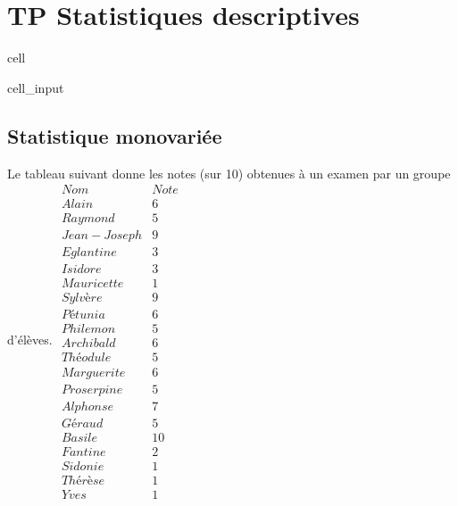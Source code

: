 \documentclass[letterpaper,10pt,french]{sphinxmanual}
\begin{document}
\sphinxstepscope


\chapter{TP Statistiques descriptives}
\label{\detokenize{TP1_statsDescriptives:tp-statistiques-descriptives}}\label{\detokenize{TP1_statsDescriptives::doc}}
\begin{sphinxuseclass}{cell}
\begin{sphinxuseclass}{cell_input}
\begin{sphinxVerbatim}[commandchars=\\\{\}]
   
   
\end{sphinxVerbatim}

\end{sphinxuseclass}
\end{sphinxuseclass}

\section{Statistique monovariée}
\label{\detokenize{TP1_statsDescriptives:statistique-monovariee}}
\sphinxAtStartPar
Le tableau suivant donne les notes (sur 10) obtenues à un examen par un groupe d’élèves.
\(\begin{array}{c|c}
Nom & Note \\
  \hline
Alain &6\\
Raymond &5\\
Jean-Joseph &9\\
Eglantine &3\\
Isidore &3\\
Mauricette &1\\
Sylvère &9\\
Pétunia &6\\
Philemon &5\\
Archibald &6\\
Théodule &5\\
Marguerite &6\\
Proserpine &5\\
Alphonse &7\\
Géraud &5\\
Basile &10\\
Fantine &2\\
Sidonie &1\\
Thérèse &1\\
Yves &1
\end{array}\)
\end{document}
